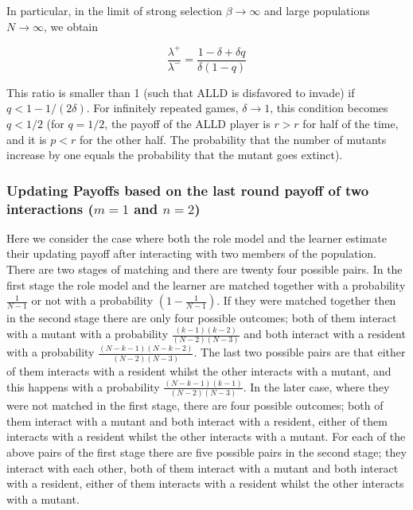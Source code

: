 \documentclass[11pt]{article}
\theoremstyle{plainCl1}
\theoremstyle{plainCl2}
\begin{document}
In particular, in the limit of strong selection \(\beta \rightarrow \infty\) and
large populations \(N \rightarrow \infty \), we obtain

\begin{equation*}
    \frac{\lambda^{+}}{\lambda^{-}} = \frac{1 - \delta + \delta q}{\delta(1 - q)}
\end{equation*}

This ratio is smaller than 1 (such that ALLD is disfavored to invade) if \(q <
1- 1/(2 \delta)\). For infinitely repeated games, \(\delta \rightarrow 1\), this
condition becomes \(q < 1/2\) (for \(q = 1/2\), the payoff of the ALLD player is
\(r > r\) for half of the time, and it is \(p < r\) for the other half. The
probability that the number of mutants increase by one equals the probability
that the mutant goes extinct).

\subsubsection{Updating Payoffs based on the last round payoff of two interactions (\(m=1\) and \(n=2\))}\label{section:m_one_n_two}

Here we consider the case where both the role model and the learner estimate
their updating payoff after interacting with two members of the population.
There are two stages of matching and there are twenty four possible pairs. In
the first stage the role model and the learner are matched together with a
probability $\frac{1}{N-1}$ or not with a probability $(1 - \frac{1}{N-1})$. If
they were matched together then in the second stage there are only four possible
outcomes; both of them interact with a mutant with a probability
$\frac{(k-1)(k-2)}{(N-2)(N-3)}$ and both interact with a resident with a
probability $\frac{(N-k-1)(N-k-2)}{(N-2)(N-3)}$. The last two possible pairs are
that either of them interacts with a resident whilst the other interacts with a
mutant, and this happens with a probability $\frac{(N-k-1)(k-1)}{(N-2)(N-3)}$.
In the later case, where they were not matched in the first stage, there are
four possible outcomes; both of them interact with a mutant and both interact
with a resident, either of them interacts with a resident whilst the other
interacts with a mutant. For each of the above pairs of the first stage there
are five possible pairs in the second stage; they interact with each other, both
of them interact with a mutant and both interact with a resident, either of them
interacts with a resident whilst the other interacts with a mutant.
\end{document}
